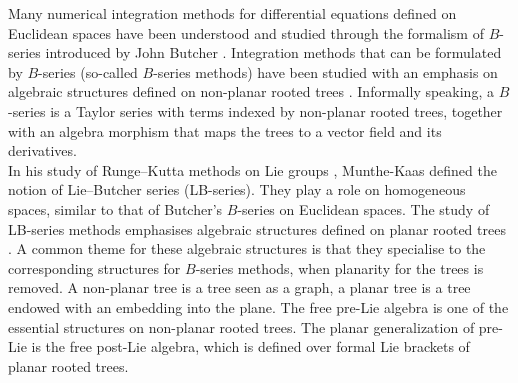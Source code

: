 \documentclass[10pt,a4paper]{article}
\begin{document}
Many numerical integration methods for differential equations defined on Euclidean spaces have been understood and studied through the formalism of $B$-series introduced by John Butcher \cite{Butcher1972,Butcher2008,CalvoSanz-Serna1994,HairerWanner1974}. Integration methods that can be formulated by $B$-series (so-called $B$-series methods) have been studied with an emphasis on algebraic structures defined on non-planar rooted trees \cite{MclachlanModinMunthe-KaasVerdier2017}. Informally speaking, a $B$-series is a Taylor series with terms indexed by non-planar rooted trees, together with an algebra morphism that maps the trees to a vector field and its derivatives. \\
In his study of Runge--Kutta methods on Lie groups \cite{Munthe-Kaas1995,Munthe-Kaas1998}, Munthe-Kaas defined the notion of Lie--Butcher series (LB-series). They play a role on homogeneous spaces, similar to that of Butcher's $B$-series on Euclidean spaces. The study of LB-series methods emphasises algebraic structures defined on planar rooted trees \cite{CurryEbrahimi-FardMunthe-Kaas2017,LundervoldMunthe-Kaas2011,Munthe-KaasWright2008,Munthe-KaasLundervold2012}. A common theme for these algebraic structures is that they specialise to the corresponding structures for $B$-series methods, when planarity for the trees is removed. A non-planar tree is a tree seen as a graph, a planar tree is a tree endowed with an embedding into the plane. The free pre-Lie algebra is one of the essential structures on non-planar rooted trees. The planar generalization of pre-Lie is the free post-Lie algebra, which is defined over formal Lie brackets of planar rooted trees.  \\
\end{document}

